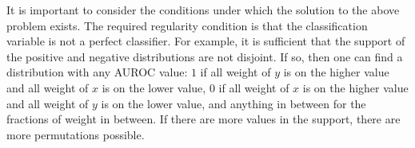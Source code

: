 It is important to consider the conditions under which the solution to the above problem exists.
%
The required regularity condition is that the classification variable is not a perfect classifier.
For example, it is sufficient that the support of the positive and negative distributions are not disjoint.
If so, then one can find a distribution with any AUROC value:
$1$ if all weight of $y$ is on the higher value and all weight of $x$ is on the lower value,
$0$ if all weight of $x$ is on the higher value and all weight of $y$ is on the lower value,
and anything in between for the fractions of weight in between.
If there are more values in the support, there are more permutations possible.


